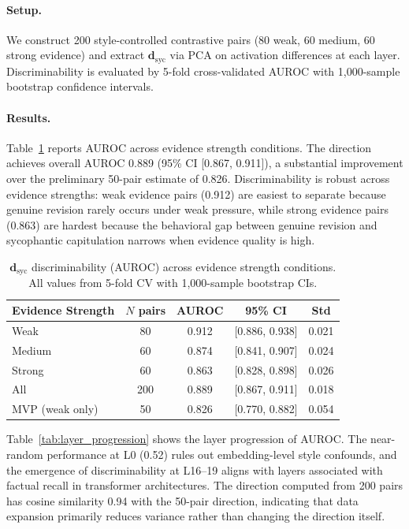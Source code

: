\documentclass[11pt]{article}
\begin{document}
\paragraph{Setup.}
We construct 200 style-controlled contrastive pairs (80 weak, 60 medium, 60 strong evidence) and extract $\mathbf{d}_\text{syc}$ via PCA on activation differences at each layer. Discriminability is evaluated by 5-fold cross-validated AUROC with 1,000-sample bootstrap confidence intervals.

\paragraph{Results.}
Table~\ref{tab:auroc_evidence} reports AUROC across evidence strength conditions. The direction achieves overall AUROC 0.889 (95\% CI [0.867, 0.911]), a substantial improvement over the preliminary 50-pair estimate of 0.826. Discriminability is robust across evidence strengths: weak evidence pairs (0.912) are easiest to separate because genuine revision rarely occurs under weak pressure, while strong evidence pairs (0.863) are hardest because the behavioral gap between genuine revision and sycophantic capitulation narrows when evidence quality is high.

\begin{table}[h]
\centering
\caption{$\mathbf{d}_\text{syc}$ discriminability (AUROC) across evidence strength conditions. All values from 5-fold CV with 1,000-sample bootstrap CIs.}
\label{tab:auroc_evidence}
\begin{tabular}{lcccc}
\toprule
Evidence Strength & $N$ pairs & AUROC & 95\% CI & Std \\
\midrule
Weak     & 80  & 0.912 & [0.886, 0.938] & 0.021 \\
Medium   & 60  & 0.874 & [0.841, 0.907] & 0.024 \\
Strong   & 60  & 0.863 & [0.828, 0.898] & 0.026 \\
\midrule
All      & 200 & 0.889 & [0.867, 0.911] & 0.018 \\
MVP (weak only) & 50 & 0.826 & [0.770, 0.882] & 0.054 \\
\bottomrule
\end{tabular}
\end{table}

Table~\ref{tab:layer_progression} shows the layer progression of AUROC. The near-random performance at L0 (0.52) rules out embedding-level style confounds, and the emergence of discriminability at L16--19 aligns with layers associated with factual recall in transformer architectures. The direction computed from 200 pairs has cosine similarity 0.94 with the 50-pair direction, indicating that data expansion primarily reduces variance rather than changing the direction itself.
\end{document}
